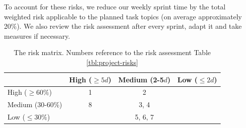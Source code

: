 To account for these risks, we reduce our weekly sprint time by the total weighted risk applicable to the planned task topics (on average approximately 20\%). We also review the risk assessment after every sprint, adapt it and take measures if necessary.


\begin{table}[h]
	\centering
	\begin{tabu}{|l|c|c|c|}
		\hline
		  & High ($\geq 5d$) & Medium (2-5$d$) & Low ($\leq 2d$) \\ \hline
		High ($\geq 60\%$)
	      & 1 & 2 & \\ \hline
		Medium (30-60\%)
		  & 8 & 3, 4 &  \\ \hline
		Low ($\leq 30\%$)
		  & & 5, 6, 7 & \\ \hline
	\end{tabu}
	\caption[Risk matrix]{The risk matrix. Numbers reference to the risk assessment Table \ref{tbl:project-risks}}
	\label{tbl:risk-matrix}
\end{table}


